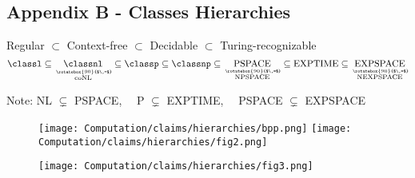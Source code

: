 

\subsection{Appendix B - Classes Hierarchies}
\begin{center}
\begin{large}
Regular $\subset$ Context-free $\subset$ Decidable $\subset$ Turing-recognizable
\newcommand{\verteq}{\rotatebox{90}{$\,=$}}
\newcommand{\equalto}[2]{\underset{\scriptstyle\overset{\mkern4mu\verteq}{#2}}{#1}}
\[
    \classl \subseteq \equalto{\classnl}{\text{coNL}} \subseteq \classp \subseteq \classnp \subseteq \equalto{\text{PSPACE}}{\text{NPSPACE}} \subseteq \text{EXPTIME} \subseteq \equalto{\text{EXPSPACE}}{\text{NEXPSPACE}}
\]
\vspace{2em}
\begin{footnotesize}
    Note: NL $\subsetneq$ PSPACE,$\quad$ P $\subsetneq$ EXPTIME,$\quad$ PSPACE $\subsetneq$ EXPSPACE
\end{footnotesize}
\end{large}

\vspace{1em}

\begin{figure}[!ht]
    \centering
    \texttt{[image: Computation/claims/hierarchies/bpp.png]}
    \texttt{[image: Computation/claims/hierarchies/fig2.png]}
\end{figure}

\clearpage

\begin{figure}[!ht]
    \centering
    \texttt{[image: Computation/claims/hierarchies/fig3.png]}
\end{figure}

\end{center}

